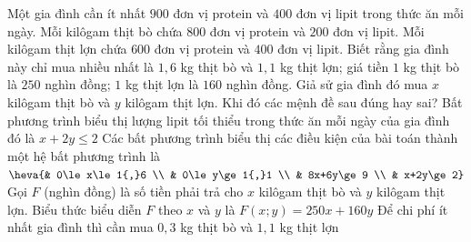 \begin{ex}%
	Một gia đình cần ít nhất $900$ đơn vị protein và $400$ đơn vị lipit trong thức ăn mỗi ngày. Mỗi kilôgam thịt bò chứa $800$ đơn vị protein và $200$ đơn vị lipit. Mỗi kilôgam thịt lợn chứa $600$ đơn vị protein và $400$ đơn vị lipit. Biết rằng gia đình này chỉ mua nhiều nhất là $1{,}6$ kg thịt bò và $1{,}1$ kg thịt lợn; giá tiền $1$ kg thịt bò là $250$ nghìn đồng; $1$ kg thịt lợn là $160$ nghìn đồng. Giả sử gia đình đó mua $x$ kilôgam thịt bò và $y$ kilôgam thịt lợn. Khi đó các mệnh đề sau đúng hay sai?
	\choiceTF
	{Bất phương trình biểu thị lượng lipit tối thiểu trong thức ăn mỗi ngày của gia đình đó là $x+2y\le 2$}
	{\True Các bất phương trình biểu thị các điều kiện của bài toán thành một hệ bất phương trình là $\heva{& 0\le x\le 1{,}6 \\ & 0\le y\ge 1{,}1 \\ & 8x+6y\ge 9 \\ & x+2y\ge 2}$}
	{\True Gọi $F$ (nghìn đồng) là số tiền phải trả cho $x$ kilôgam thịt bò và $y$ kilôgam thịt lợn. Biểu thức biểu diễn $F$ theo $x$ và $y$ là $F(x;y)=250x+160y$}
	{\True Để chi phí ít nhất gia đình thì cần mua $0{,}3$ kg thịt bò và $1{,}1$ kg thịt lợn}
\end{ex}
